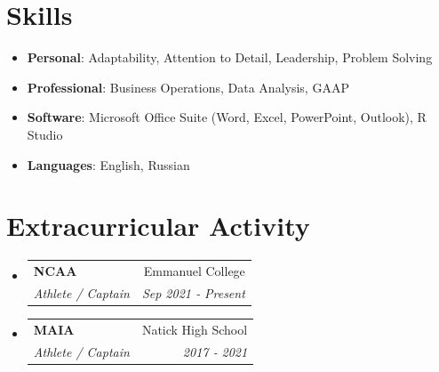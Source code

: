 \documentclass[letterpaper,]{article}
\makeatletter
\newcommand{\resumeItem}[2]{
  \item\small{
    \textbf{#1}{: #2 \vspace{-2pt}}
  }
}
\newcommand{\resumeSubheading}[4]{
  \vspace{-1pt}\item
    \begin{tabular*}{0.97\textwidth}[t]{l@{\extracolsep{\fill}}r}
      \textbf{#1} & #2 \\
      \textit{\small#3} & \textit{\small #4} \\
    \end{tabular*}
    \vspace{-5pt}
}
\newcommand*{\resumeSubheadingItem}[2]{
  \begin{tabular*}{0.97\textwidth}[t]{l@{\extracolsep{\fill}}r}
    \textit{\small#1} & \textit{\small #2} \\
  \end{tabular*}
}
\newcommand{\resumeSubItem}[2]{\resumeItem{#1}{#2}\vspace{-4pt}}
\newcommand{\resumeSubHeadingListStart}{\begin{itemize}[leftmargin=*]}
\newcommand{\resumeSubHeadingListEnd}{\end{itemize}}
\makeatother
\begin{document}
\section{Skills}
  \resumeSubHeadingListStart
    
      \resumeSubItem{Personal}
        {Adaptability, Attention to Detail, Leadership, Problem Solving}
    
      \resumeSubItem{Professional}
        {Business Operations, Data Analysis, GAAP}

      \resumeSubItem{Software}
        {Microsoft Office Suite (Word, Excel, PowerPoint, Outlook), R Studio}
    
      \resumeSubItem{Languages}
        {English, Russian}

  \resumeSubHeadingListEnd
  
\section{Extracurricular Activity}
  \resumeSubHeadingListStart

    \resumeSubheading
      {NCAA}{Emmanuel College}
      {Athlete / Captain}{Sep 2021 ‑ Present}

    \resumeSubheading
      {MAIA}{Natick High School}
      {Athlete / Captain}{2017 ‑ 2021}
    
  \resumeSubHeadingListEnd
\end{document}
